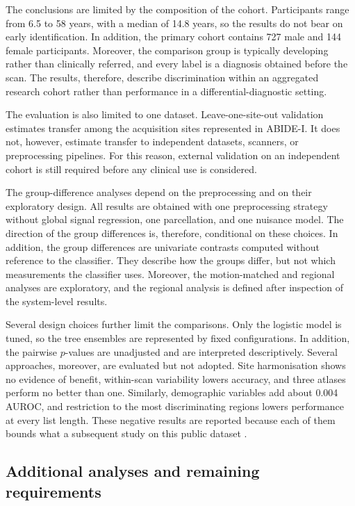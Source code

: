 The conclusions are limited by the composition of the cohort. Participants range from 6.5 to
58 years, with a median of 14.8 years, so the results do not bear on early identification.
In addition, the primary cohort contains 727 male and 144 female participants. Moreover, the
comparison group is typically developing rather than clinically referred, and every label is
a diagnosis obtained before the scan. The results, therefore, describe discrimination within
an aggregated research cohort rather than performance in a differential-diagnostic setting.

The evaluation is also limited to one dataset. Leave-one-site-out validation estimates
transfer among the acquisition sites represented in ABIDE-I. It does not, however, estimate
transfer to independent datasets, scanners, or preprocessing pipelines. For this reason,
external validation on an independent cohort is still required before any clinical use is
considered.

The group-difference analyses depend on the preprocessing and on their exploratory design.
All results are obtained with one preprocessing strategy without global signal regression,
one parcellation, and one nuisance model. The direction of the group differences is,
therefore, conditional on these choices. In addition, the group differences are univariate
contrasts computed without reference to the classifier. They describe how the groups differ,
but not which measurements the classifier uses. Moreover, the motion-matched and regional
analyses are exploratory, and the regional analysis is defined after inspection of the
system-level results.

Several design choices further limit the comparisons. Only the logistic model is tuned, so
the tree ensembles are represented by fixed configurations. In addition, the pairwise
$p$-values are unadjusted and are interpreted descriptively. Several approaches, moreover,
are evaluated but not adopted. Site harmonisation shows no evidence of benefit, within-scan
variability lowers accuracy, and three atlases perform no better than one. Similarly,
demographic variables add about 0.004 AUROC, and restriction to the most discriminating
regions lowers performance at every list length. These negative results are reported because
each of them bounds what a subsequent study on this public dataset .

\subsection{Additional analyses and remaining requirements}
\label{subsec:required-validation}

